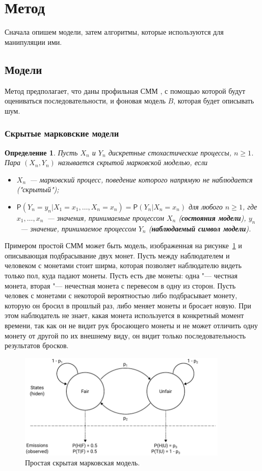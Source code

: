 \documentclass[specialist,
substylefile = spbu_report.rtx,
subf,href,colorlinks=true, 12pt]{disser}
\newtheorem{defenition}{Определение}
\begin{document}
		\section{Метод}
		Сначала опишем модели, затем алгоритмы, которые используются для манипуляции ими.
		\subsection{Модели}
		Метод предполагает, что даны профильная СММ \cite{Compeau2015a}, с помощью которой будут оцениваться последовательности, и фоновая модель $B$, которая будет описывать шум.
		\subsubsection{Скрытые марковские модели}						
			\begin{defenition}
				Пусть $X_{n}$ и $Y_{n}$ дискретные стохастические процессы, $n \geq 1$. Пара $(X_{n}, Y_{n})$ называется скрытой марковской моделью, если
				\begin{itemize}
					\item $X_{n}$~--- марковский процесс, поведение которого напрямую не наблюдается ("скрытый");
					\item $\mathsf{P}(Y_{n} = y_{n}|X_{1} = x_{1},\dots, X_{n} = x_{n}) = \mathsf{P}(Y_{n}|X_{n}=x_{n})$ для любого $n \geq 1$, где $x_{1},\dots,x_{n}$~--- значения, принимаемые процессом  $X_{n}$ (\textbf{состояния модели}), $ y_{n}$~--- значение, принимаемое процессом $Y_{n}$ (\textbf{наблюдаемый символ модели}).
				\end{itemize}
			\end{defenition}
		
			Примером простой СММ может быть модель, изображенная на рисунке~\ref{fg:2} и описывающая подбрасывание двух монет. Пусть между наблюдателем и человеком с монетами стоит ширма, которая позволяет наблюдателю видеть только пол, куда падают монеты. Пусть есть две монеты: одна "--- честная монета, вторая "--- нечестная монета с перевесом в одну из сторон. Пусть человек с монетами с некоторой вероятностью либо подбрасывает монету, которую он бросил в прошлый раз, либо меняет монеты и бросает новую. При этом наблюдатель не знает, какая монета используется в конкретный момент времени, так как он не видит рук бросающего монеты и не может отличить одну монету от другой по их внешнему виду, он видит только последовательность результатов бросков.
			
			\begin{figure}[h]
				\includegraphics[width=10cm]{figure1}
				\centering
				\caption{Простая скрытая марковская модель.} \label{fg:2}
			\end{figure}
		
\end{document}

